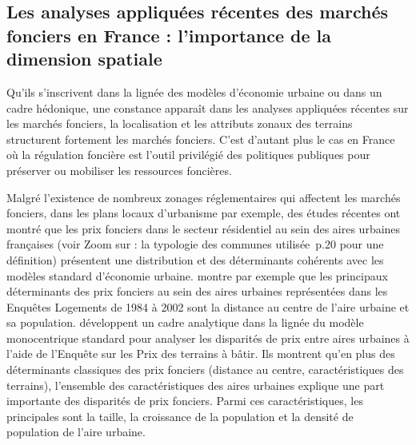 \documentclass[10.5pt,a4paper]{article}
\begin{document}
{\subsection{Les analyses appliquées récentes des marchés fonciers en France : l'importance de la dimension spatiale }

Qu'ils s'inscrivent dans la lignée des modèles d'économie urbaine ou dans un cadre hédonique, une constance apparaît dans les analyses appliquées récentes sur les marchés fonciers, la localisation et les attributs zonaux des terrains structurent fortement les marchés fonciers. C'est d'autant plus le cas en France où la régulation foncière est l'outil privilégié des politiques publiques pour préserver ou mobiliser les ressources foncières. \par

Malgré l'existence de nombreux zonages réglementaires qui affectent les marchés fonciers, dans les plans locaux d'urbanisme par exemple, des études récentes ont montré que les prix fonciers dans le secteur résidentiel au sein des aires urbaines françaises (voir \og Zoom sur : la typologie des communes utilisée\fg~p.20 pour une définition) présentent une distribution et des déterminants cohérents avec les modèles standard d'économie urbaine.  \cite{Goffette09} montre par exemple que les principaux déterminants des prix fonciers au sein des aires urbaines représentées dans les Enquêtes Logements de 1984 à 2002 sont la distance au centre de l'aire urbaine et sa population.  \cite{Combes_etal11, Combes_etal12} développent un cadre analytique dans la lignée du modèle monocentrique standard pour analyser les disparités de prix entre aires urbaines à l'aide de l'Enquête sur les Prix des terrains à bâtir. Ils montrent qu'en plus des déterminants classiques des prix fonciers (distance au centre, caractéristiques des terrains), l'ensemble des caractéristiques des aires urbaines explique une part importante des disparités de prix fonciers. Parmi ces caractéristiques, les principales sont la taille, la croissance de la population et la densité de population de l'aire urbaine. \par

}
\end{document}
